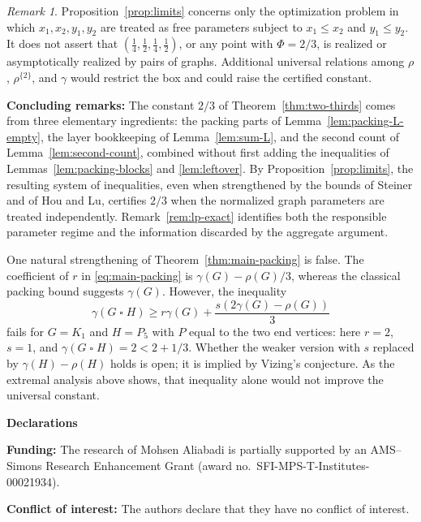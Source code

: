 \documentclass[10pt]{amsart}
\theoremstyle{remark}
\newtheorem{remark}[theorem]{Remark}
\newcommand{\rhoTwo}{\rho^{\{2\}}}
\begin{document}
\begin{remark}\label{rem:free-parameters}
Proposition~\ref{prop:limits} concerns only the optimization problem in which
$x_1,x_2,y_1,y_2$ are treated as free parameters subject to
$x_1\leq x_2$ and $y_1\leq y_2$. It does not assert that
$(\tfrac14,\tfrac12,\tfrac14,\tfrac12)$, or any point with $\Phi=2/3$, is
realized or asymptotically realized by pairs of graphs. Additional universal
relations among $\rho$, $\rhoTwo$, and $\gamma$ would restrict the box and
could raise the certified constant.
\end{remark}



\textbf{Concluding remarks:} The constant $2/3$ of Theorem~\ref{thm:two-thirds} comes from three elementary
ingredients: the packing parts of Lemma~\ref{lem:packing-L-empty}, the layer
bookkeeping of Lemma~\ref{lem:sum-L}, and the second count of
Lemma~\ref{lem:second-count}, combined without first adding the inequalities
of Lemmas~\ref{lem:packing-blocks} and \ref{lem:leftover}. By
Proposition~\ref{prop:limits}, the resulting system of inequalities, even when
strengthened by the bounds of Steiner and of Hou and Lu, certifies
$2/3$ when the normalized graph parameters are treated independently.
Remark~\ref{rem:lp-exact} identifies both the responsible parameter regime and
the information discarded by the aggregate argument.

One natural strengthening of Theorem~\ref{thm:main-packing} is false. The
coefficient of $r$ in \eqref{eq:main-packing} is
$\gamma(G)-\rho(G)/3$, whereas the classical packing bound suggests
$\gamma(G)$. However, the inequality
\[
 \gamma(G\mathbin{\square}H)
 \geq r\gamma(G)+\frac{s(2\gamma(G)-\rho(G))}{3}
\]
fails for $G=K_1$ and $H=P_5$ with $P$ equal to the two end vertices: here
$r=2$, $s=1$, and
$\gamma(G\mathbin{\square}H)=2<2+1/3$. Whether the weaker version with $s$
replaced by $\gamma(H)-\rho(H)$ holds is open; it is implied by Vizing's
conjecture. As the extremal analysis above shows, that inequality alone would
not improve the universal constant.
\bigskip


\noindent \textbf{Declarations}

\medskip
\noindent\textbf{\small Funding:} {\small The research of Mohsen Aliabadi is partially supported by an AMS--Simons Research Enhancement Grant (award no.~SFI-MPS-T-Institutes-00021934).} 

\medskip
\noindent \textbf{\small Conflict of interest:} {\small The authors declare that they have no conflict of interest.}
\end{document}
